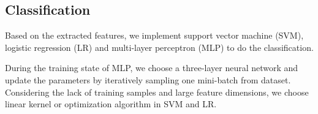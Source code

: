 \subsection{Classification}
Based on the extracted features, we implement support vector machine (SVM), logistic regression (LR) and multi-layer perceptron (MLP) to do the classification.

During the training state of MLP, we choose a three-layer neural network and update the parameters by iteratively sampling one mini-batch from dataset.
Considering the lack of training samples and large feature dimensions, we choose linear kernel or optimization algorithm in SVM and LR.
